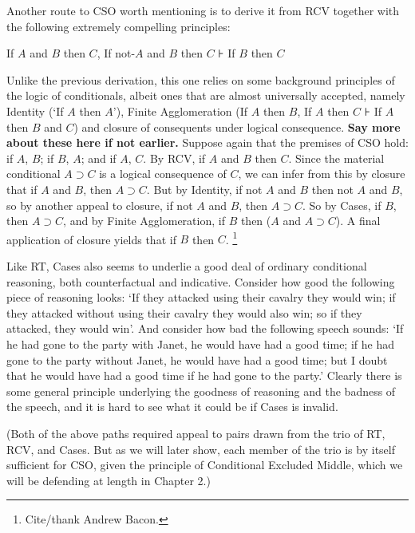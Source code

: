 \documentclass[If.tex]{subfiles}
\begin{document}
Another route to CSO worth mentioning is to derive it from RCV together with the following extremely compelling principles:
\begin{prop}
	\litem[Cases]
	If $A$ and $B$ then $C$, If not-$A$ and $B$ then $C$ ⊦ If $B$ then $C$
\end{prop}
Unlike the previous derivation, this one relies on some background principles of the logic of conditionals, albeit ones that are almost universally accepted, namely Identity (‘If $A$ then $A$’), Finite Agglomeration (If $A$ then $B$, If $A$ then $C$ ⊦ If $A$ then $B$ and $C$) and closure of consequents under logical consequence. \textbf{Say more about these here if not earlier.} Suppose again that the premises of CSO hold: if $A$, $B$; if $B$, $A$; and if $A$, $C$. By RCV, if $A$ and $B$ then $C$. Since the material conditional $A⊃C$ is a logical consequence of $C$, we can infer from this by closure that if $A$ and $B$, then $A⊃C$. But by Identity, if not $A$ and $B$ then not $A$ and $B$, so by another appeal to closure, if not $A$ and $B$, then $A⊃C$. So by Cases, if $B$, then $A⊃C$, and by Finite Agglomeration, if $B$ then ($A$ and $A⊃C$). A final application of closure yields that if $B$ then $C$.%
\footnote{Cite/thank Andrew Bacon.}


Like RT, Cases also seems to underlie a good deal of ordinary conditional reasoning, both counterfactual and indicative. Consider how good the following piece of reasoning looks: ‘If they attacked using their cavalry they would win; if they attacked without using their cavalry they would also win; so if they attacked, they would win’. And consider how bad the following speech sounds: ‘If he had gone to the party with Janet, he would have had a good time; if he had gone to the party without Janet, he would have had a good time; but I doubt that he would have had a good time if he had gone to the party.’ Clearly there is some general principle underlying the goodness of reasoning and the badness of the speech, and it is hard to see what it could be if Cases is invalid.

(Both of the above paths required appeal to pairs drawn from the trio of RT, RCV, and Cases. But as we will later show, each member of the trio is by itself sufficient for CSO, given the principle of Conditional Excluded Middle, which we will be defending at length in Chapter 2.)
\end{document}
